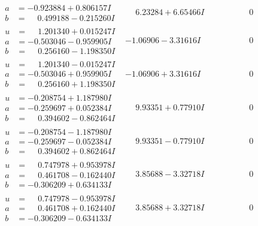\documentclass[1p]{elsarticle_modified}
\theoremstyle{definition}
\begin{document}
$$\begin{array}{c|c|c}
\begin{aligned}
a &= -0.923884 + 0.806157 I \\
b &= \phantom{-}0.499188 - 0.215260 I\end{aligned}
 & \phantom{-}6.23284 + 6.65466 I & \phantom{-0.000000 } 0 \\ \hline\begin{aligned}
u &= \phantom{-}1.201340 + 0.015247 I \\
a &= -0.503046 - 0.959905 I \\
b &= \phantom{-}0.256160 - 1.198350 I\end{aligned}
 & -1.06906 - 3.31616 I & \phantom{-0.000000 } 0 \\ \hline\begin{aligned}
u &= \phantom{-}1.201340 - 0.015247 I \\
a &= -0.503046 + 0.959905 I \\
b &= \phantom{-}0.256160 + 1.198350 I\end{aligned}
 & -1.06906 + 3.31616 I & \phantom{-0.000000 } 0 \\ \hline\begin{aligned}
u &= -0.208754 + 1.187980 I \\
a &= -0.259697 + 0.052384 I \\
b &= \phantom{-}0.394602 - 0.862464 I\end{aligned}
 & \phantom{-}9.93351 + 0.77910 I & \phantom{-0.000000 } 0 \\ \hline\begin{aligned}
u &= -0.208754 - 1.187980 I \\
a &= -0.259697 - 0.052384 I \\
b &= \phantom{-}0.394602 + 0.862464 I\end{aligned}
 & \phantom{-}9.93351 - 0.77910 I & \phantom{-0.000000 } 0 \\ \hline\begin{aligned}
u &= \phantom{-}0.747978 + 0.953978 I \\
a &= \phantom{-}0.461708 - 0.162440 I \\
b &= -0.306209 + 0.634133 I\end{aligned}
 & \phantom{-}3.85688 - 3.32718 I & \phantom{-0.000000 } 0 \\ \hline\begin{aligned}
u &= \phantom{-}0.747978 - 0.953978 I \\
a &= \phantom{-}0.461708 + 0.162440 I \\
b &= -0.306209 - 0.634133 I\end{aligned}
 & \phantom{-}3.85688 + 3.32718 I & \phantom{-0.000000 } 0 \\ \hline\begin{aligned}

\end{aligned}
\end{array}$$
\end{document}
